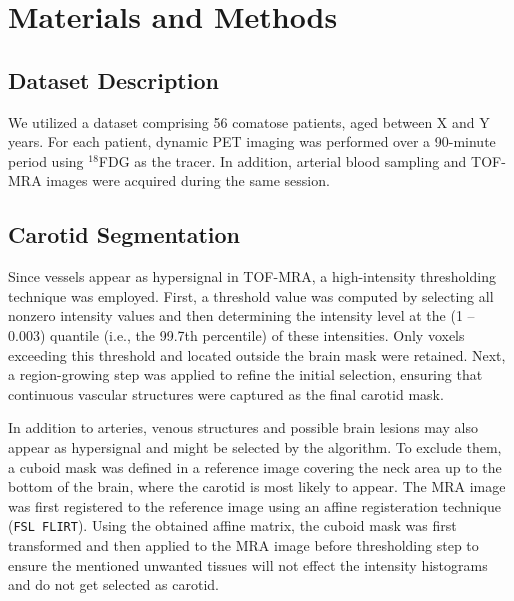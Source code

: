 \chapter{Materials and Methods}

\section{Dataset Description}
We utilized a dataset comprising 56 comatose patients, aged between X and Y years.
For each patient, dynamic PET imaging was performed over a 90-minute period using \(^{18}\)FDG as the tracer.
In addition, arterial blood sampling and TOF-MRA images were acquired during the same session. 

\section{Carotid Segmentation\label{sec:carotid}}
Since vessels appear as hypersignal in TOF-MRA, a high-intensity thresholding technique was employed.
First, a threshold value was computed by selecting all nonzero intensity values and then determining the intensity level at the (1 – 0.003) quantile (i.e., the 99.7th percentile) of these intensities.
Only voxels exceeding this threshold and located outside the brain mask were retained.
Next, a region-growing step was applied to refine the initial selection, ensuring that continuous vascular structures were captured as the final carotid mask.

In addition to arteries, venous structures and possible brain lesions may also appear as hypersignal and might be selected by the algorithm.
To exclude them, a cuboid mask was defined in a reference image covering the neck area up to the bottom of the brain, where the carotid is most likely to appear.
The MRA image was first registered to the reference image using an affine registeration technique (\texttt{\small FSL FLIRT}).
Using the obtained affine matrix, the cuboid mask was first transformed and then applied to the MRA image before thresholding step to ensure the mentioned unwanted tissues will not effect the intensity histograms and do not get selected as carotid.


